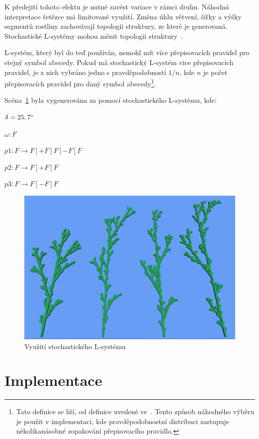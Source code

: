 \documentclass[thesis=M,czech]{FITthesis}[2019/12/23]
\begin{document}
K předejití tohoto efektu je nutné zavést variace v rámci druhu. Náhodná interpretace řetězce má limitované využití. Změna úhlu větvení, šířky a výšky segmentů rostliny zachovávají topologii struktury, ze které je generovaná. Stochastické L-systémy mohou měnit topologii struktury~\cite{abop28}.

L-systém, který byl do teď používán, nemohl mít více přepisovacích pravidel pro stejný symbol abecedy. Pokud má stochastický L-systém vice přepisovacích pravidel, je z nich vybráno jedno s pravděpodobností $1/n$, kde $n$ je počet přepisovacích pravidel pro daný symbol abecedy\footnote{Tato definice se liší, od definice uvedené ve~\cite{abop28}. Tento způsob náhodného výběru je použit v implementaci, kde pravděpodobnostní distribuci zastupuje několikanásobné zopakování přepisovacího pravidla.}.

Scéna~\ref{fig:plant_stoch} byla vygenerována za pomocí stochastického L-systému, kde:

\bigskip 
$\delta = 25,7\degree$

\medskip
$\omega: F$

\medskip
$p1: F \rightarrow F[+F]F[-F]F$

\medskip
$p2: F \rightarrow F[+F]F$

\medskip
$p3: F \rightarrow F[-F]F$

\begin{figure}\centering
	\includegraphics[width=\textwidth]{images/plant_stoch}
	\caption[Využití stochastického L-systému]{Využití stochastického L-systému}\label{fig:plant_stoch}
\end{figure}

\section{Implementace}
\end{document}
